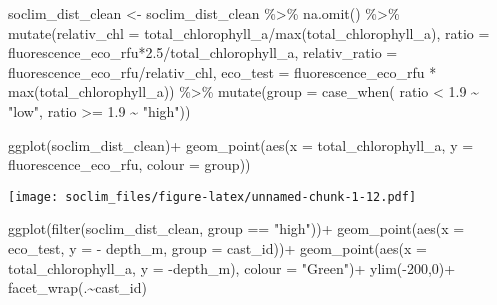 \documentclass[
]{article}
\newenvironment{Shaded}{\begin{snugshade}}{\end{snugshade}}
\newcommand{\AttributeTok}[1]{\textcolor[rgb]{0.77,0.63,0.00}{#1}}
\newcommand{\DecValTok}[1]{\textcolor[rgb]{0.00,0.00,0.81}{#1}}
\newcommand{\FloatTok}[1]{\textcolor[rgb]{0.00,0.00,0.81}{#1}}
\newcommand{\FunctionTok}[1]{\textcolor[rgb]{0.00,0.00,0.00}{#1}}
\newcommand{\NormalTok}[1]{#1}
\newcommand{\OtherTok}[1]{\textcolor[rgb]{0.56,0.35,0.01}{#1}}
\newcommand{\SpecialCharTok}[1]{\textcolor[rgb]{0.00,0.00,0.00}{#1}}
\newcommand{\StringTok}[1]{\textcolor[rgb]{0.31,0.60,0.02}{#1}}
\begin{document}
\begin{Shaded}
\begin{Highlighting}[]
\NormalTok{soclim\_dist\_clean }\OtherTok{\textless{}{-}}\NormalTok{ soclim\_dist\_clean }\SpecialCharTok{\%\textgreater{}\%}
  \FunctionTok{na.omit}\NormalTok{() }\SpecialCharTok{\%\textgreater{}\%}
  \FunctionTok{mutate}\NormalTok{(}\AttributeTok{relativ\_chl =}\NormalTok{ total\_chlorophyll\_a}\SpecialCharTok{/}\FunctionTok{max}\NormalTok{(total\_chlorophyll\_a),}
         \AttributeTok{ratio =}\NormalTok{ fluorescence\_eco\_rfu}\SpecialCharTok{*}\FloatTok{2.5}\SpecialCharTok{/}\NormalTok{total\_chlorophyll\_a,}
         \AttributeTok{relativ\_ratio =}\NormalTok{ fluorescence\_eco\_rfu}\SpecialCharTok{/}\NormalTok{relativ\_chl,}
         \AttributeTok{eco\_test =}\NormalTok{ fluorescence\_eco\_rfu }\SpecialCharTok{*} \FunctionTok{max}\NormalTok{(total\_chlorophyll\_a)) }\SpecialCharTok{\%\textgreater{}\%}
  \FunctionTok{mutate}\NormalTok{(}\AttributeTok{group =} \FunctionTok{case\_when}\NormalTok{(}
\NormalTok{    ratio }\SpecialCharTok{\textless{}} \FloatTok{1.9} \SpecialCharTok{\textasciitilde{}} \StringTok{"low"}\NormalTok{,}
\NormalTok{    ratio }\SpecialCharTok{\textgreater{}=} \FloatTok{1.9} \SpecialCharTok{\textasciitilde{}} \StringTok{"high"}\NormalTok{))}

\FunctionTok{ggplot}\NormalTok{(soclim\_dist\_clean)}\SpecialCharTok{+}
  \FunctionTok{geom\_point}\NormalTok{(}\FunctionTok{aes}\NormalTok{(}\AttributeTok{x =}\NormalTok{ total\_chlorophyll\_a, }\AttributeTok{y =}\NormalTok{ fluorescence\_eco\_rfu, }\AttributeTok{colour =}\NormalTok{ group))}
\end{Highlighting}
\end{Shaded}

\texttt{[image: soclim\_files/figure-latex/unnamed-chunk-1-12.pdf]}

\begin{Shaded}
\begin{Highlighting}[]
\FunctionTok{ggplot}\NormalTok{(}\FunctionTok{filter}\NormalTok{(soclim\_dist\_clean, group }\SpecialCharTok{==} \StringTok{"high"}\NormalTok{))}\SpecialCharTok{+}
  \FunctionTok{geom\_point}\NormalTok{(}\FunctionTok{aes}\NormalTok{(}\AttributeTok{x =}\NormalTok{ eco\_test, }\AttributeTok{y =} \SpecialCharTok{{-}}\NormalTok{ depth\_m, }\AttributeTok{group =}\NormalTok{ cast\_id))}\SpecialCharTok{+}
  \FunctionTok{geom\_point}\NormalTok{(}\FunctionTok{aes}\NormalTok{(}\AttributeTok{x =}\NormalTok{ total\_chlorophyll\_a, }\AttributeTok{y =} \SpecialCharTok{{-}}\NormalTok{depth\_m), }\AttributeTok{colour =} \StringTok{"Green"}\NormalTok{)}\SpecialCharTok{+}
  \FunctionTok{ylim}\NormalTok{(}\SpecialCharTok{{-}}\DecValTok{200}\NormalTok{,}\DecValTok{0}\NormalTok{)}\SpecialCharTok{+}
  \FunctionTok{facet\_wrap}\NormalTok{(.}\SpecialCharTok{\textasciitilde{}}\NormalTok{cast\_id)}
\end{Highlighting}
\end{Shaded}
\end{document}
